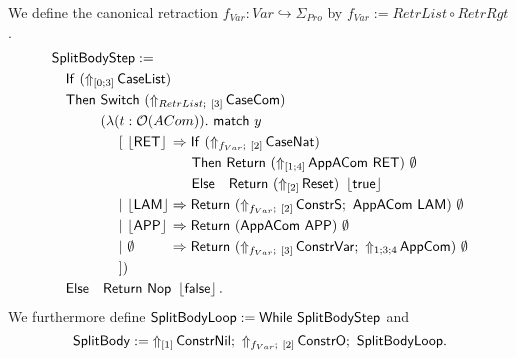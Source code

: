 \begin{definition}
  \label{def:JumpTarget}
  We define the canonical retraction $f_{Var} : Var \hookrightarrow \Sigma_{Pro}$ by $f_{Var} := RetrList \circ RetrRgt$.
  \begin{alignat*}{1}
    & \MS{SplitBodyStep} := \\
    & \quad \MS{If}~(\LiftTapes{\MS{CaseList}}{\Vector{0;3}}) \\
    & \quad \MS{Then}~\Switch~(\LiftBoth{\MS{CaseCom}}{RetrList}{\Vector{3}}) \\
    & \quad \phantom{\MS{Then}}~(\lambda (t : \Option(ACom)).~\MS{match}~y\\
    & \quad \phantom{\MS{Then}~(\lambda}~[~ \phalign{\Some{\MS{LAM}}}{\Some{\MS{RET}}} \Rightarrow \MS{If}~(\LiftBoth{\MS{CaseNat}}{f_{Var}}{\Vector{2}}) \\
    & \quad \phantom{\MS{Then}~(\lambda~[~ \Some{\MS{LAM} \Rightarrow}}~\MS{Then}~ \Return{(\LiftTapes{\MS{AppACom~\MS{RET}}}{\Vector{1;4}})}{\None} \\
    & \quad \phantom{\MS{Then}~(\lambda~[~ \Some{\MS{LAM} \Rightarrow}}~\MS{Else}~~~ \Return{(\LiftTapes{\MS{Reset}}{\Vector{2}})}{\Some\true} \\
    & \quad \phantom{\MS{Then}~(\lambda}~|~ \phalign{\Some{\MS{LAM}}}{\Some{\MS{LAM}}} \Rightarrow \Return{(\LiftBoth{\MS{ConstrS}}{f_{Var}}{\Vector{2}} \Seq \MS{AppACom}~\MS{LAM})}{\None} \\
    & \quad \phantom{\MS{Then}~(\lambda}~|~ \phalign{\Some{\MS{LAM}}}{\Some{\MS{APP}}} \Rightarrow \Return{(\MS{AppACom}~\MS{APP})}{\None} \\
    & \quad \phantom{\MS{Then}~(\lambda}~|~ \phalign{\Some{\MS{LAM}}}{\None} \Rightarrow \Return{(\LiftBoth{\MS{ConstrVar}}{f_{Var}}{\Vector{3}} \Seq \LiftTapes{\MS{AppCom}}{1;3;4})}{\None} \\
    & \quad \phantom{\MS{Then}~(\lambda}~]) \\
    & \quad \MS{Else}~~~ \Return{\Nop}{\Some\false}.
  \end{alignat*}
  We furthermore define $\MS{SplitBodyLoop} := \While~\MS{SplitBodyStep}$ and
  \[
    \MS{SplitBody} := \LiftTapes{\MS{ConstrNil}}{\Vector{1}} \Seq \LiftBoth{\MS{ConstrO}}{f_{Var}}{\Vector{2}} \Seq \MS{SplitBodyLoop}.
  \]
\end{definition}

